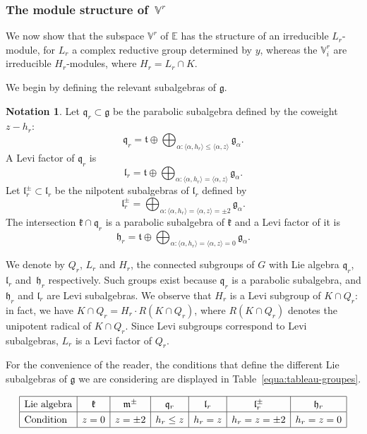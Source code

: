 \documentclass[10pt]{amsart}
\theoremstyle{plain}
\theoremstyle{definition}
\newtheorem{nota}[theo]{Notation}
\let\rgy r
\newcommand{\bE}{\mathbb{E}}
\newcommand{\Vr}{\mathbb{V}^\rgy}
\newcommand{\fgg}{\mathfrak{g}}
\newcommand{\fh}{\mathfrak{h}}
\newcommand{\fk}{\mathfrak{k}}
\newcommand{\fl}{\mathfrak{l}}
\newcommand{\fm}{\mathfrak{m}}
\newcommand{\fq}{\mathfrak{q}}
\newcommand{\ft}{\mathfrak{t}}
\newcommand{\scal}[1]{\langle #1 \rangle}
\begin{document}
\subsubsection{The module structure of $\,\Vr$}

We now show that the subspace $\Vr$ of $\bE$ has the structure of an irreducible $L_\rgy$-module, for
$L_\rgy$ a complex reductive group
determined by $y$, whereas the $\Vr_i$ are irreducible $H_\rgy$-modules, where $H_\rgy=L_\rgy\cap K$.

We begin by defining the relevant subalgebras of $\fgg$.

\begin{nota}\label{defi:qlh}
Let $\fq_\rgy \subset \fgg$ be the parabolic subalgebra defined by the coweight $z-h_\rgy$:
$$ \fq_\rgy = \ft \oplus \bigoplus_{\alpha:\scal{\alpha,h_\rgy} \leq \scal{\alpha,z}} \fgg_\alpha . $$
A Levi factor of $\fq_\rgy$ is
$$\fl_\rgy=\ft \oplus \bigoplus_{\alpha:\scal{\alpha,h_\rgy} = \scal{\alpha,z}} \fgg_\alpha . $$
Let $\fl_\rgy^\pm \subset \fl_\rgy$ be the nilpotent subalgebras of $\fl_\rgy$ defined by
$$\fl_\rgy^\pm = \bigoplus_{\alpha:\scal{\alpha,h_\rgy} = \scal{\alpha,z} = \pm 2} \fgg_\alpha . $$
The intersection $\fk\cap\fq_\rgy$ is a parabolic subalgebra of $\fk$ and a Levi factor of it is
$$\fh_\rgy = \ft \oplus \bigoplus_{\alpha:\scal{\alpha,h_\rgy} = \scal{\alpha,z}=0} \fgg_\alpha .$$

We denote by $Q_\rgy$, $L_\rgy$ and $H_\rgy$, the connected subgroups of $G$ with
Lie algebra $\fq_\rgy$,~$\fl_\rgy$ and~$\fh_\rgy$ respectively. Such groups exist because $\fq_\rgy$ is a parabolic subalgebra, and
$\fh_\rgy$ and $\fl_\rgy$ are Levi subalgebras.
We observe that
$H_\rgy$ is a Levi subgroup of $K \cap Q_\rgy$: in fact, we have $K\cap Q_\rgy = H_\rgy \cdot R(K \cap Q_\rgy)$, where
$R(K \cap Q_\rgy)$ denotes the unipotent
radical of $K \cap Q_\rgy$. Since Levi subgroups correspond to Levi subalgebras,
$L_\rgy$ is a Levi factor of $Q_\rgy$.
\end{nota}

For the convenience of the reader, the conditions that define the different Lie subalgebras of $\fgg$
we are
considering are displayed in Table~\ref{equa:tableau-groupes}.

\begin{table}[ht]
$$\arraycolsep5pt\renewcommand{\arraystretch}{1.3}
\begin{array}{|l|c|c|c|c|c|c|}
\hline \mbox{Lie algebra} & \fk & \fm^\pm & \fq_\rgy & \fl_\rgy & \fl_\rgy^\pm & \fh_\rgy \\
\hline \mbox{Condition} & z=0 & z = \pm 2 & h_\rgy \leq z & h_\rgy=z & h_\rgy=z=\pm 2 & h_\rgy=z=0 \\
\hline
\end{array}
$$
\caption{\smaller Lie subalgebras under consideration (We abbreviate the condition
$\scal{\alpha,z}=0$,
\resp $\scal{\alpha,h_\rgy}=0$, on a root $\alpha$ as $z=0$, \resp $h_\rgy=0$.)}\label{equa:tableau-groupes}
\end{table}
\end{document}
